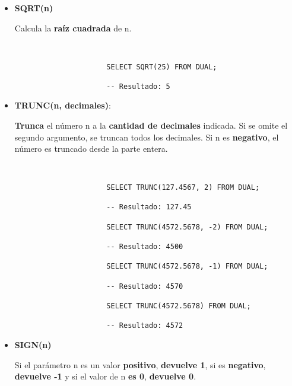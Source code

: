 \begin{itemize}
      \item \textbf{SQRT(n)}

      Calcula la \textbf{raíz cuadrada} de n.

    \begin{figure}[H]
        \begin{tcolorbox}[sharp corners, colback=yellow!30, colframe=white!20]
            \scriptsize
            \begin{verbatim}


                SELECT SQRT(25) FROM DUAL;

                -- Resultado: 5
            \end{verbatim}
        \end{tcolorbox}
    \end{figure}

    \item \textbf{TRUNC(n, decimales)}:

    \textbf{Trunca} el número n a la \textbf{cantidad de decimales} indicada. Si se omite el segundo argumento, se truncan todos los decimales. Si n es \textbf{negativo}, el número es truncado desde la parte entera.

    \begin{figure}[H]
        \begin{tcolorbox}[sharp corners, colback=yellow!30, colframe=white!20]
            \scriptsize
            \begin{verbatim}


                SELECT TRUNC(127.4567, 2) FROM DUAL;

                -- Resultado: 127.45

                SELECT TRUNC(4572.5678, -2) FROM DUAL;

                -- Resultado: 4500

                SELECT TRUNC(4572.5678, -1) FROM DUAL;

                -- Resultado: 4570

                SELECT TRUNC(4572.5678) FROM DUAL;

                -- Resultado: 4572
            \end{verbatim}
        \end{tcolorbox}
    \end{figure}

    \item \textbf{SIGN(n)}

    Si el parámetro n es un valor \textbf{positivo}, \textbf{devuelve 1}, si es \textbf{negativo}, \textbf{devuelve -1} y si el valor de n \textbf{es 0}, \textbf{devuelve 0}.


\end{itemize}
